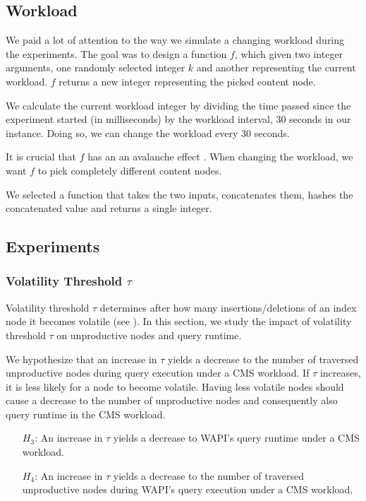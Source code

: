 \message{ !name(thesis.tex)}\documentclass[abstracton,12pt]{scrartcl}
\theoremstyle{definition}
\begin{document}
\subsection{Workload}

We paid a lot of attention to the way we simulate a changing workload during the
experiments. The goal was to design a function $f$, which given two integer
arguments, one randomly selected integer $k$ and another representing the
current workload. $f$ returns a new integer representing the picked content node.

We calculate the current workload integer by dividing the time passed since the
experiment started (in milliseconds) by the workload interval, 30 seconds in our
instance. Doing so, we can change the workload every 30 seconds.

It is crucial that $f$ has an an avalanche effect \cite{HF73}. When changing the
workload, we want $f$ to pick completely different content nodes.

We selected a function that takes the two inputs, concatenates them, hashes the
concatenated value and returns a single integer.

\subsection{Experiments}

\subsubsection{Volatility Threshold $\tau$}

Volatility threshold $\tau$ determines after how many insertions/deletions of an index node
it becomes volatile (see ). In this section, we study the impact of
volatility threshold $\tau$ on unproductive nodes and query runtime.

We hypothesize that an increase in $\tau$ yields a decrease to the number of
traversed unproductive nodes during query execution under a CMS workload. If
$\tau$ increases, it is
less likely for a node to become volatile. Having less volatile nodes should
cause a decrease to the number of unproductive nodes and consequently also query
runtime in the CMS workload.

\begin{shaded}
  \begin{itemize}
  \item[$H_3$:] An increase in $\tau$ yields a decrease to WAPI's query runtime
    under a CMS workload. 
  \item[$H_4$:] An increase in $\tau$ yields a decrease to the number of
    traversed unproductive nodes during WAPI's query execution under a CMS workload.
  \end{itemize}
\end{shaded}
\end{document}
